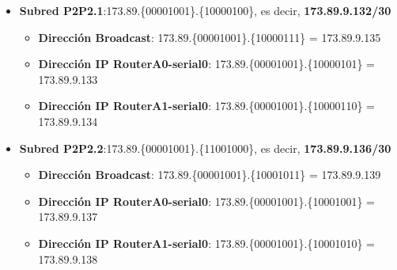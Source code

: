 \begin{itemize}
\begin{itemize}
		\end{itemize}
	\item{\textbf{Subred P2P2.1}:}173.89.\{\textcolor{azul}{000010}\textcolor{rojo}{01}\}.\{\textcolor{rojo}{100001}00\}, es decir, \textbf{173.89.9.132/30}
		\begin{itemize}
			\item{\textbf{Dirección Broadcast}}: 173.89.\{\textcolor{azul}{000010}\textcolor{rojo}{01}\}.\{\textcolor{rojo}{100001}11\} = 173.89.9.135
			\item{\textbf{Dirección IP RouterA0-serial0}}: 173.89.\{\textcolor{azul}{000010}\textcolor{rojo}{01}\}.\{\textcolor{rojo}{100001}01\} = 173.89.9.133
			\item{\textbf{Dirección IP RouterA1-serial0}}: 173.89.\{\textcolor{azul}{000010}\textcolor{rojo}{01}\}.\{\textcolor{rojo}{100001}10\} = 173.89.9.134
		\end{itemize}
	\item{\textbf{Subred P2P2.2}:}173.89.\{\textcolor{azul}{000010}\textcolor{rojo}{01}\}.\{\textcolor{rojo}{110010}00\}, es decir, \textbf{173.89.9.136/30}
		\begin{itemize}
			\item{\textbf{Dirección Broadcast}}: 173.89.\{\textcolor{azul}{000010}\textcolor{rojo}{01}\}.\{\textcolor{rojo}{100010}11\} = 173.89.9.139
			\item{\textbf{Dirección IP RouterA0-serial0}}: 173.89.\{\textcolor{azul}{000010}\textcolor{rojo}{01}\}.\{\textcolor{rojo}{100010}01\} = 173.89.9.137
			\item{\textbf{Dirección IP RouterA1-serial0}}: 173.89.\{\textcolor{azul}{000010}\textcolor{rojo}{01}\}.\{\textcolor{rojo}{100010}10\} = 173.89.9.138
		\end{itemize}
\end{itemize}


